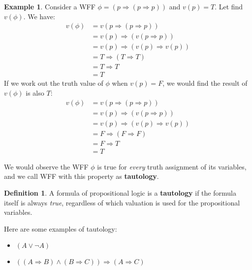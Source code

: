 \documentclass[11pt]{article}
\theoremstyle{definition}
\newtheorem{defn}{Definition}[subsection]
\newtheorem{eg}{Example}
\begin{document}
\begin{eg}
    Consider a WFF $\phi=(p \Rightarrow (p \Rightarrow p))$ and $v(p)=T$. Let find $v(\phi)$.
    We have:
    \begin{equation}
        \begin{split}
            v(\phi) &= v(p \Rightarrow (p \Rightarrow p))\\
                    &= v(p) \Rightarrow (v(p \Rightarrow p))\\
                    &= v(p) \Rightarrow (v(p) \Rightarrow v(p))\\
                    &= T \Rightarrow (T \Rightarrow T)\\
                    &= T \Rightarrow T\\
                    &= T
        \end{split}
    \end{equation}
    If we work out the truth value of $\phi$ when $v(p)=F$, we would find the result of $v(\phi)$ is also $T$:
    \begin{equation}
        \begin{split}
            v(\phi) &= v(p \Rightarrow (p \Rightarrow p))\\
                    &= v(p) \Rightarrow (v(p \Rightarrow p))\\
                    &= v(p) \Rightarrow (v(p) \Rightarrow v(p))\\
                    &= F \Rightarrow (F \Rightarrow F)\\
                    &= F \Rightarrow T\\
                    &= T
        \end{split}
    \end{equation}
\end{eg}

We would observe the WFF $\phi$ is true for \textit{every} truth assignment of its variables, and we call WFF with this property as \textbf{tautology}.

\begin{shaded}
\begin{defn}
    A formula of propositional logic is a \textbf{tautology} if the formula itself is always \textit{true}, regardless of which valuation is used for the propositional variables. 
\end{defn}
\end{shaded}

Here are some examples of tautology:
\begin{itemize}
    \item $(A \vee \neg A)$
    \item $((A \Rightarrow B) \wedge (B \Rightarrow C)) \Rightarrow (A \Rightarrow C)$
\end{itemize}
\end{document}

